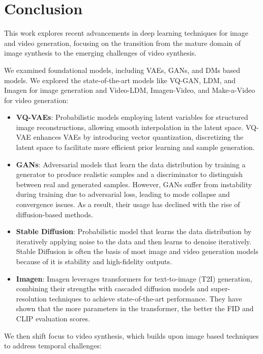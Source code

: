 \section{Conclusion}

This work explores recent advancements in deep learning techniques for image and video generation, focusing on the transition from the mature domain of image synthesis to the emerging challenges of video synthesis.

We examined foundational models, including VAEs, GANs, and DMs based models. We explored the state-of-the-art models like VQ-GAN, LDM, and Imagen for image generation and Video-LDM, Imagen-Video, and Make-a-Video for video generation:

\begin{itemize}
    \item \textbf{VQ-VAEs}: Probabilistic models employing latent variables for structured image reconstructions, allowing smooth interpolation in the latent space. VQ-VAE enhances VAEs by introducing vector quantization, discretizing the latent space to facilitate more efficient prior learning and sample generation.
    
    \item \textbf{GANs}: Adversarial models that learn the data distribution by training a generator to produce realistic samples and a discriminator to distinguish between real and generated samples. However, GANs suffer from instability during training due to adversarial loss, leading to mode collapse and convergence issues. As a result, their usage has declined with the rise of diffusion-based methods.
    
    \item \textbf{Stable Diffusion}: Probabilistic model that learns the data distribution by iteratively applying noise to the data and then learns to denoise iteratively. Stable Diffusion is often the basis of most image and video generation models because of it is stability and high-fidelity outputs.
    
    \item \textbf{Imagen}: Imagen leverages transformers for text-to-image (T2I) generation, combining their strengths with cascaded diffusion models and super-resolution techniques to achieve state-of-the-art performance. They have shown that the more parameters in the transformer, the better the FID and CLIP evaluation scores.
\end{itemize}

We then shift focus to video synthesis, which builds upon image based techniques to address temporal challenges:

